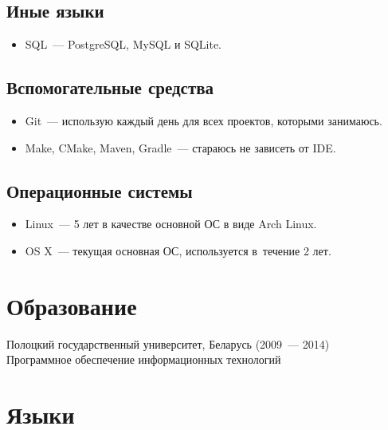     \subsection*{Иные языки}

      \begin{itemize}

        \item SQL~--- PostgreSQL, MySQL и SQLite.

      \end{itemize}

    \subsection*{Вспомогательные средства}

      \begin{itemize}

        \item Git~--- использую каждый день для всех проектов, которыми занимаюсь.

        \item Make, CMake, Maven, Gradle~--- стараюсь не зависеть от IDE.

      \end{itemize}

    \subsection*{Операционные системы}

      \begin{itemize}

        \item Linux~--- 5 лет в качестве основной ОС в виде Arch Linux.

        \item OS X~--- текущая основная ОС, используется в~течение 2 лет.

      \end{itemize}


  \section*{Образование}

    Полоцкий государственный университет, Беларусь (2009~--- 2014) \\
    Программное обеспечение информационных технологий


  \section*{Языки}

